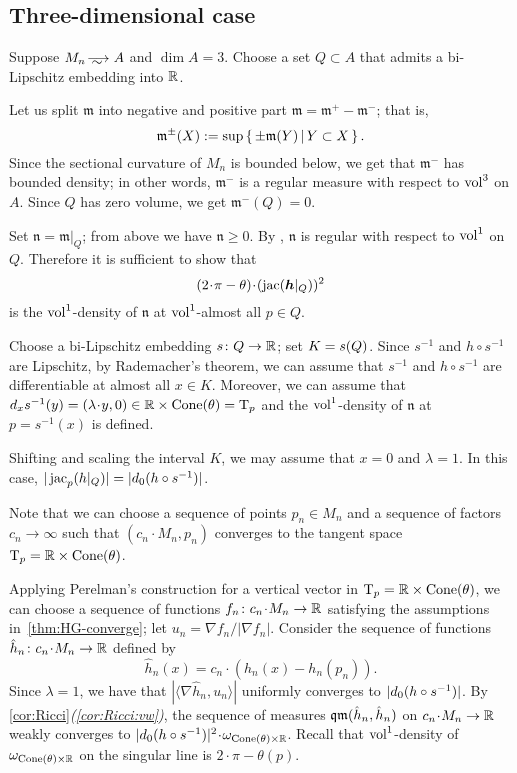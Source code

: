 \subsection{Three-dimensional case}\label{subsec:3d}


Suppose $M_n\smooths{}A$ and $\dim A=3$.
Choose a set $Q\subset A$ that admits a bi-Lipschitz embedding into $\mathbb{R}$. 

Let us split $\mathfrak m$ into negative and positive part $\mathfrak m=\mathfrak m^+-\mathfrak m^-$; that is,
\[\mathfrak m^\pm(X)\mathrel{{:}{=}}\sup\left\{\,\pm\mathfrak m(Y)\,\middle|\,Y\subset X\,\right\}.\]
Since the sectional curvature of $M_n$ is bounded below, we get that $\mathfrak m^-$ has bounded density; in other words, $\mathfrak m^-$ is a regular measure with respect to $\operatorname{vol}^3$ on $A$.
Since $Q$ has zero volume, we get $\mathfrak m^-(Q)=0$.

Set $\mathfrak n=\mathfrak m|_{Q}$; from above we have $\mathfrak n\ge 0$.
By \cite{petrunin-SC}, $\mathfrak n$ is regular with respect to $\operatorname{vol}^1$ on $Q$.
Therefore it is sufficient to show that 
\[(2\cdot\pi-\theta)\cdot (\jac(\bm{h}|_Q))^2\]
is the $\operatorname{vol}^1$-density of $\mathfrak n$
at $\operatorname{vol}^1$-almost all $p\in Q$.

Choose a bi-Lipschitz embedding $s\colon Q\to \mathbb{R}$;
set $K\zz=s(Q)$.
Since $s^{-1}$ and $h\circ s^{-1}$ are Lipschitz, 
by Rademacher's theorem, we can assume that $s^{-1}$ and $h\circ s^{-1}$ are differentiable at almost all $x\in K$.
Moreover, we can assume that $d_xs^{-1}(y)=(\lambda\cdot y,0)\in \RR\times \Cone(\theta)=\T_p$ and the $\operatorname{vol}^1$-density of $\mathfrak n$ at $p=s^{-1}(x)$ is defined.

Shifting and scaling the interval $K$, we may assume that $x=0$ and $\lambda=1$.
In this case, $|\mathop{\rm jac}_p(h|_Q)|=|d_0(h\circ s^{-1})|$.

Note that we can choose a sequence of points $p_n\in M_n$ and a sequence of factors $c_n\to \infty$ such that $(c_n\cdot M_n,p_n)$ converges to the tangent space~$\mathrm{T}_p=\mathbb{R}\times \operatorname{Cone}(\theta)$.


Applying Perelman's construction \cite[7.1.1 and 7.2.3]{petrunin-conc} for a vertical vector in $\T_p=\RR\zz\times \Cone(\theta)$,
we can choose a sequence of functions $f_n\:c_n\cdot M_n\to \RR$ satisfying the assumptions in~\ref{thm:HG-converge}; 
let $u_n=\nabla f_n/|\nabla f_n|$.
Consider the sequence of functions $\hat h_n\:c_n\cdot M_n\to \RR$ defined by 
\[\hat h_n(x)=c_n\cdot(h_n(x)-h_n(p_n)).\]
Since $\lambda=1$, we have that $|\langle\nabla \hat h_n,u_n\rangle|$ uniformly converges to $|d_0(h\zz\circ s^{-1})|$.
By \ref{cor:Ricci}\textit{(\ref{cor:Ricci:vw})}, the sequence of measures $\operatorname{\mathfrak{qm}}(\hat h_n, \hat h_n)$ on $c_n\cdot M_n\to \RR$ weakly converges to $|d_0(h\zz\circ s^{-1})|^2\cdot\omega_{\Cone(\theta)\times\RR}$.
Recall that $\operatorname{vol}^1$-density of $\omega_{\operatorname{Cone}(\theta)\times\mathbb{R}}$ on the singular line is $2\cdot \pi-\theta(p)$.

